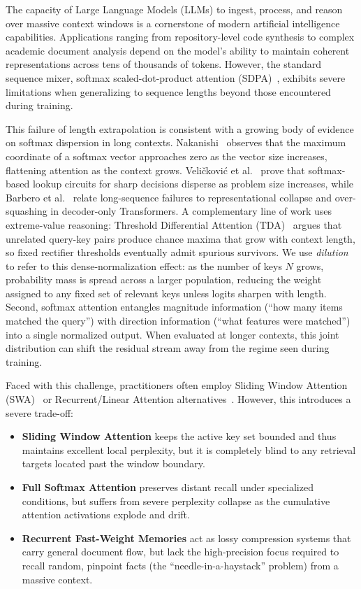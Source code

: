 \documentclass{article} %
\begin{document}
The capacity of Large Language Models (LLMs) to ingest, process, and reason over massive context windows is a cornerstone of modern artificial intelligence capabilities. Applications ranging from repository-level code synthesis to complex academic document analysis depend on the model's ability to maintain coherent representations across tens of thousands of tokens. However, the standard sequence mixer, softmax scaled-dot-product attention (SDPA)~\citep{Vaswani+2017}, exhibits severe limitations when generalizing to sequence lengths beyond those encountered during training.

This failure of length extrapolation is consistent with a growing body of evidence on softmax dispersion in long contexts. Nakanishi~\citep{nakanishi2025scalable} observes that the maximum coordinate of a softmax vector approaches zero as the vector size increases, flattening attention as the context grows. Veli{\v{c}}kovi{\'c} et al.~\citep{velickovic2025softmax} prove that softmax-based lookup circuits for sharp decisions disperse as problem size increases, while Barbero et al.~\citep{barbero2024glasses} relate long-sequence failures to representational collapse and over-squashing in decoder-only Transformers. A complementary line of work uses extreme-value reasoning: Threshold Differential Attention (TDA)~\citep{huang2026threshold} argues that unrelated query-key pairs produce chance maxima that grow with context length, so fixed rectifier thresholds eventually admit spurious survivors. We use \textit{dilution} to refer to this dense-normalization effect: as the number of keys $N$ grows, probability mass is spread across a larger population, reducing the weight assigned to any fixed set of relevant keys unless logits sharpen with length. Second, softmax attention entangles magnitude information (``how many items matched the query'') with direction information (``what features were matched'') into a single normalized output. When evaluated at longer contexts, this joint distribution can shift the residual stream away from the regime seen during training.

Faced with this challenge, practitioners often employ Sliding Window Attention (SWA)~\citep{beltagy2020longformer} or Recurrent/Linear Attention alternatives~\citep{deltanet2024, mamba2023}. However, this introduces a severe trade-off:
\begin{itemize}
    \item \textbf{Sliding Window Attention} keeps the active key set bounded and thus maintains excellent local perplexity, but it is completely blind to any retrieval targets located past the window boundary.
    \item \textbf{Full Softmax Attention} preserves distant recall under specialized conditions, but suffers from severe perplexity collapse as the cumulative attention activations explode and drift.
    \item \textbf{Recurrent Fast-Weight Memories} act as lossy compression systems that carry general document flow, but lack the high-precision focus required to recall random, pinpoint facts (the ``needle-in-a-haystack'' problem) from a massive context.
\end{itemize}
\end{document}
